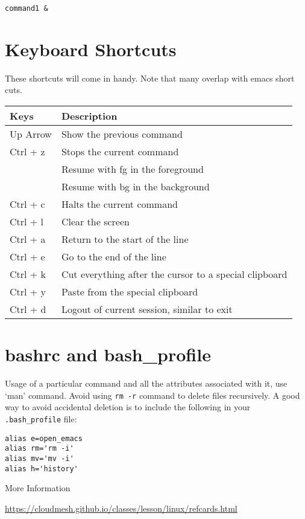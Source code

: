 \begin{verbatim}
command1 &
\end{verbatim}



\section{Keyboard Shortcuts}\label{keyboard-shortcuts}

These shortcuts will come in handy. Note that many overlap with emacs
short cuts.

\begin{tabular}{ll}
Keys     & Description  \\
\hline
Up Arrow & Show the previous command\\
Ctrl + z & Stops the current command  \\
         & Resume with fg in the foreground \\
         & Resume with bg in the background \\
Ctrl + c & Halts the current command\\
Ctrl + l & Clear the screen\\
Ctrl + a & Return to the start of the line\\
Ctrl + e & Go to the end of the line\\
Ctrl + k & Cut everything after the cursor to a special clipboard\\
Ctrl + y & Paste from the special clipboard \\
Ctrl + d & Logout of current session, similar to exit \\
\end{tabular}

\section{bashrc and bash\_profile}

Usage of a particular command and all the attributes associated with it,
use `man' command. Avoid using \verb|rm -r| command to delete files
recursively. A good way to avoid accidental deletion is to include the
following in your \verb|.bash_profile| file:

\begin{verbatim}
alias e=open_emacs
alias rm='rm -i'
alias mv='mv -i' 
alias h='history'
\end{verbatim}

More Information

\url{https://cloudmesh.github.io/classes/lesson/linux/refcards.html}

